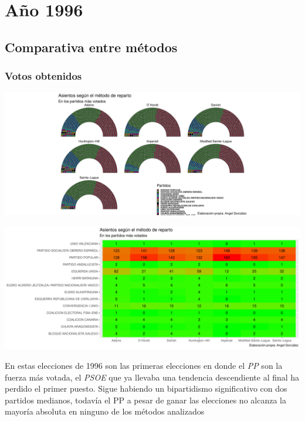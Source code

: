 \documentclass[12pt,a4paper,]{book}
\numberwithin{dummy}{section}
\theoremstyle{ocrenumbox}
\theoremstyle{blacknumex}
\theoremstyle{blacknumbox}
\theoremstyle{ocrenum}
\theoremstyle{ocrenum}
\begin{document}
\hypertarget{auxf1o-1996}{%
\section{Año 1996}\label{auxf1o-1996}}

\hypertarget{comparativa-entre-muxe9todos-6}{%
\subsection{Comparativa entre
métodos}\label{comparativa-entre-muxe9todos-6}}

\hypertarget{votos-obtenidos-6}{%
\subsubsection{Votos obtenidos}\label{votos-obtenidos-6}}

\begin{center}\includegraphics[width=0.95\linewidth]{figurasR/unnamed-chunk-65-1} \end{center}

\begin{center}\includegraphics[width=0.95\linewidth]{figurasR/unnamed-chunk-65-2} \end{center}

En estas elecciones de 1996 son las primeras elecciones en donde el
\emph{PP} son la fuerza más votada, el \emph{PSOE} que ya llevaba una
tendencia descendiente al final ha perdido el primer puesto. Sigue
habiendo un bipartidismo significativo con dos partidos medianos,
todavía el PP a pesar de ganar las elecciones no alcanza la mayoría
absoluta en ninguno de los métodos analizados
\end{document}
